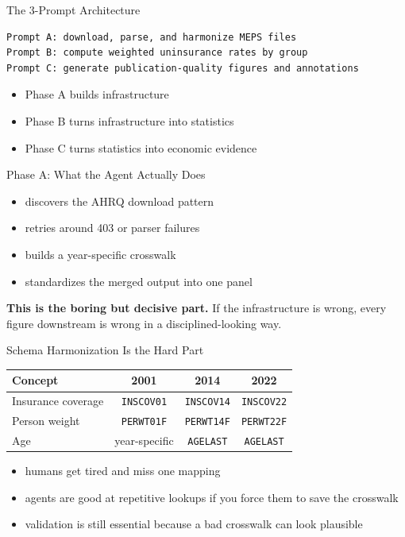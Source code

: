 \documentclass[10pt,english,aspectratio=169]{beamer}
\begin{document}
\begin{frame}[fragile]{The 3-Prompt Architecture}
\begin{lstlisting}[style=pythonstyle, language={}, basicstyle=\ttfamily\scriptsize, numbers=none]
Prompt A: download, parse, and harmonize MEPS files
Prompt B: compute weighted uninsurance rates by group
Prompt C: generate publication-quality figures and annotations
\end{lstlisting}

\vspace{0.25cm}
\begin{itemize}
    \item Phase A builds infrastructure
    \item Phase B turns infrastructure into statistics
    \item Phase C turns statistics into economic evidence
\end{itemize}
\end{frame}

\begin{frame}{Phase A: What the Agent Actually Does}
\begin{itemize}
    \item discovers the AHRQ download pattern
    \item retries around 403 or parser failures
    \item builds a year-specific crosswalk
    \item standardizes the merged output into one panel
\end{itemize}

\vspace{0.25cm}
\textbf{This is the boring but decisive part.} If the infrastructure is wrong, every figure downstream is wrong in a disciplined-looking way.
\end{frame}

\begin{frame}{Schema Harmonization Is the Hard Part}
\small
\begin{tabular}{lccc}
\toprule
\textbf{Concept} & \textbf{2001} & \textbf{2014} & \textbf{2022} \\
\midrule
Insurance coverage & \texttt{INSCOV01} & \texttt{INSCOV14} & \texttt{INSCOV22} \\
Person weight & \texttt{PERWT01F} & \texttt{PERWT14F} & \texttt{PERWT22F} \\
Age & year-specific & \texttt{AGELAST} & \texttt{AGELAST} \\
\bottomrule
\end{tabular}

\vspace{0.3cm}
\begin{itemize}
    \item humans get tired and miss one mapping
    \item agents are good at repetitive lookups if you force them to save the crosswalk
    \item validation is still essential because a bad crosswalk can look plausible
\end{itemize}
\end{frame}
\end{document}
